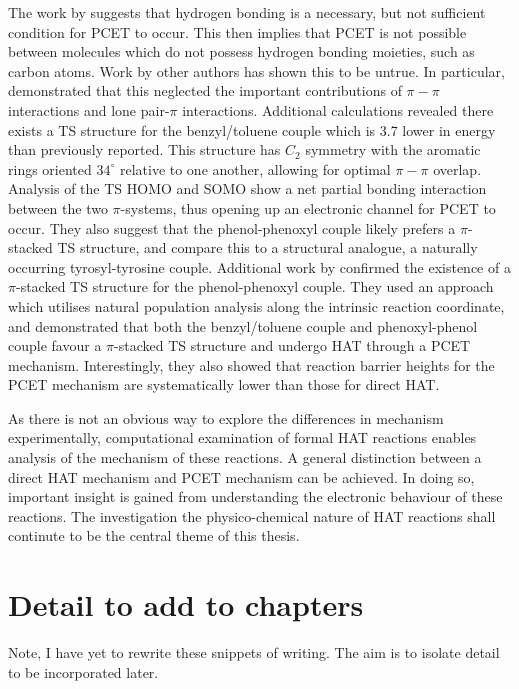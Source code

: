 The work by \citet{Mayer2002} suggests that hydrogen bonding is a necessary, but not sufficient condition for PCET to occur. This then implies that PCET is not possible between molecules which do not possess hydrogen bonding moieties, such as carbon atoms. Work by other authors has shown this to be untrue.\cite{Hatcher2007, DiLabio2007} In particular, \citet{DiLabio2007} demonstrated that this neglected the important contributions of $\pi-\pi$ interactions and lone pair-$\pi$ interactions. Additional calculations revealed there exists a TS structure for the benzyl/toluene couple which is 3.7 \kcalmol lower in energy than previously reported. This structure has $C_2$ symmetry with the aromatic rings oriented $34^\circ$ relative to one another, allowing for optimal $\pi-\pi$ overlap.
Analysis of the TS HOMO and SOMO show a net partial bonding interaction between the two $\pi$-systems, thus opening up an electronic channel for PCET to occur. They also suggest that the phenol-phenoxyl couple likely prefers a $\pi$-stacked TS structure, and compare this to a structural analogue, a naturally occurring tyrosyl-tyrosine couple. Additional work by \citet{MunozRugeles2017} confirmed the existence of a $\pi$-stacked TS structure for the phenol-phenoxyl couple. They used an approach which utilises natural population analysis along the intrinsic reaction coordinate, and demonstrated that both the benzyl/toluene couple and phenoxyl-phenol couple favour a $\pi$-stacked TS structure and undergo HAT through a PCET mechanism. Interestingly, they also showed that reaction barrier heights for the PCET mechanism are systematically lower than those for direct HAT.

As there is not an obvious way to explore the differences in mechanism experimentally, computational examination of formal HAT reactions enables analysis of the mechanism of these reactions. A general distinction between a direct HAT mechanism and PCET mechanism can be achieved. In doing so, important insight is gained from understanding the electronic behaviour of these reactions. The investigation the physico-chemical nature of HAT reactions shall continute to be the central theme of this thesis.

\section{Detail to add to chapters}

Note, I have yet to rewrite these snippets of writing. The aim is to isolate detail to be incorporated later.

